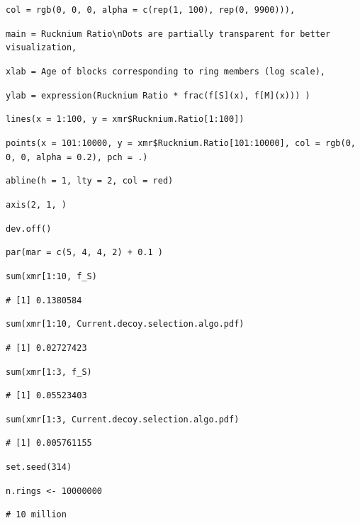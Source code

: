 \documentclass[english]{paper}
\begin{document}
{\begin{minipage}[t]{1\columnwidth - 2\fboxsep - 2\fboxrule}
\texttt{col = rgb(0, 0, 0, alpha = c(rep(1, 100), rep(0, 9900))),}

\texttt{main = \textquotedbl Rucknium Ratio\textbackslash nDots
are partially transparent for better visualization\textquotedbl ,}

\texttt{xlab = \textquotedbl Age of blocks corresponding to ring
members (log scale)\textquotedbl ,}

\texttt{ylab = expression(\textquotedbl Rucknium Ratio \textquotedbl{}
{*} frac(f{[}S{]}(x), f{[}M{]}(x))) )}

\texttt{lines(x = 1:100, y = xmr\$Rucknium.Ratio{[}1:100{]})}

\texttt{points(x = 101:10000, y = xmr\$Rucknium.Ratio{[}101:10000{]},
col = rgb(0, 0, 0, alpha = 0.2), pch = \textquotedbl .\textquotedbl )}

\texttt{abline(h = 1, lty = 2, col = \textquotedbl red\textquotedbl )}

\texttt{axis(2, 1, \textquotedbl )}

\texttt{dev.off()}

\texttt{par(mar = c(5, 4, 4, 2) + 0.1 )}

\texttt{sum(xmr{[}1:10, \textquotedbl f\_S\textquotedbl{]})}

\texttt{\# {[}1{]} 0.1380584}

\texttt{sum(xmr{[}1:10, \textquotedbl Current.decoy.selection.algo.pdf\textquotedbl{]})}

\texttt{\# {[}1{]} 0.02727423}

\texttt{sum(xmr{[}1:3, \textquotedbl f\_S\textquotedbl{]})}

\texttt{\# {[}1{]} 0.05523403}

\texttt{sum(xmr{[}1:3, \textquotedbl Current.decoy.selection.algo.pdf\textquotedbl{]})}

\texttt{\# {[}1{]} 0.005761155}

\texttt{set.seed(314)}

\texttt{n.rings <- 10000000}

\texttt{\# 10 million}%
\end{minipage}}
\end{document}
